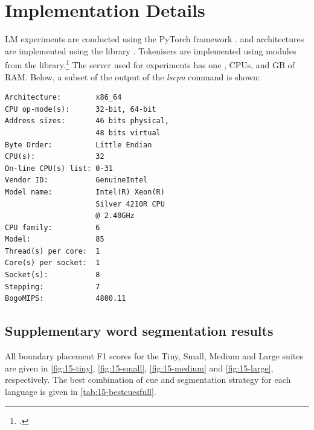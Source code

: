 \chapter{Implementation Details}\label{app:implementation}

LM experiments are conducted using the PyTorch framework \citep{paszke-etal-2019-pytorch}. \gpt and \llama architectures are implemented using the  library \citep{wolf-etal-2020-transformers}. Tokenisers are implemented using modules from the  library.\footnote{\href{https://github.com/huggingface/tokenizers}{}.} The server used for experiments has one ,  CPUs, and  GB of RAM. Below, a subset of the output of the \emph{lscpu} command is shown:

\begin{tcolorbox}[left=5pt,right=5pt,top=5pt,bottom=5pt]
\small
\begin{verbatim}
Architecture:        x86_64
CPU op-mode(s):      32-bit, 64-bit
Address sizes:       46 bits physical, 
                     48 bits virtual
Byte Order:          Little Endian
CPU(s):              32
On-line CPU(s) list: 0-31
Vendor ID:           GenuineIntel
Model name:          Intel(R) Xeon(R)
                     Silver 4210R CPU
                     @ 2.40GHz
CPU family:          6
Model:               85
Thread(s) per core:  1
Core(s) per socket:  1
Socket(s):           8
Stepping:            7
BogoMIPS:            4800.11
\end{verbatim}
\end{tcolorbox}

\section{Supplementary word segmentation results}\label{app:fullsegresults}

All boundary placement F1 scores for the Tiny, Small, Medium and Large suites are given in \cref{fig:15-tiny}, \cref{fig:15-small}, \cref{fig:15-medium} and \cref{fig:15-large}, respectively. The best combination of cue and segmentation strategy for each language is given in \cref{tab:15-bestcuesfull}.


